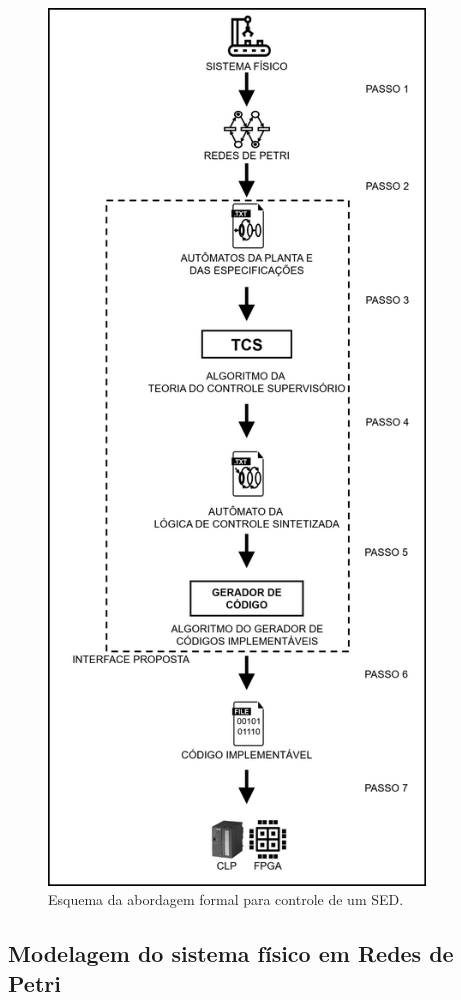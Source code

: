 \begin{figure}[!htb]
	\caption[Esquema da abordagem formal para controle de um SED]{Esquema da abordagem formal para controle de um SED.}
	\label{fig:esquemaformal}
	\includegraphics[width=10cm]{./figuras/ESQUEMA_MODELAGEM_FORMAL.png}\centering
\end{figure}

\subsection{Modelagem do sistema f\'isico em Redes de Petri}



